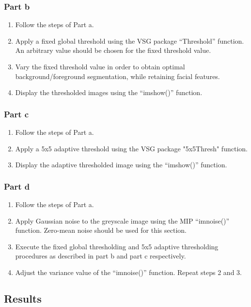 \documentclass[a4paper]{article}
\begin{document}
	\subsubsection{Part b}
	\begin{enumerate}
		\item Follow the steps of Part a.
		\item Apply a fixed global threshold using the VSG package
			``Threshold'' function. An arbitrary value should be
			chosen for the fixed threshold value.
		\item Vary the fixed threshold value in order to obtain optimal
			background/foreground segmentation, while retaining
			facial features.
		\item Display the thresholded images using the ``imshow()''
			function.
	\end{enumerate}
	\subsubsection{Part c}
	\begin{enumerate}
		\item Follow the steps of Part a.
		\item Apply a 5x5 adaptive threshold using the VSG package
			"5x5Thresh" function.
		\item Display the adaptive thresholded image using the
			``imshow()'' function.
	\end{enumerate}
	\subsubsection{Part d}
	\begin{enumerate}
		\item Follow the steps of Part a.
		\item Apply Gaussian noise to the greyscale image using the MIP
			``imnoise()'' function. Zero-mean noise should be used
			for this section.
		\item Execute the fixed global thresholding and 5x5 adaptive
			thresholding procedures as described in part b and part
			c respectively.
		\item Adjust the variance value of the ``imnoise()'' function.
			Repeat steps 2 and 3.
	\end{enumerate}
	\subsection{Results}
\end{document}
